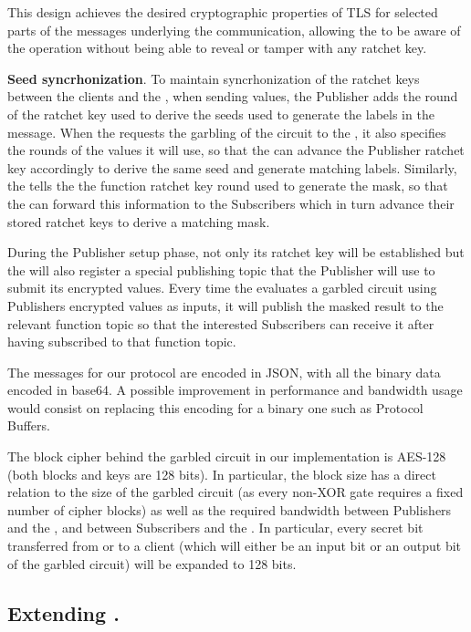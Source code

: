 This design achieves the desired cryptographic properties of TLS for selected
parts of the messages underlying the \MQTT{} communication, allowing the \broker
to be aware of the operation without being able to reveal or tamper with any
ratchet key.

\noindent\textbf{Seed syncrhonization}. To maintain syncrhonization of the
ratchet keys between the clients and the \garbler, when sending values, the
Publisher adds the round of the ratchet key used to derive the seeds used to
generate the labels in the message.  When the \broker requests the garbling of
the circuit to the \garbler, it also specifies the rounds of the values it will
use, so that the \garbler can advance the Publisher ratchet key accordingly to
derive the same seed and generate matching labels.  Similarly, the \garbler
tells the \broker the function ratchet key round used to generate the mask, so
that the \broker can forward this information to the Subscribers which in turn
advance their stored ratchet keys to derive a matching mask.

During the Publisher setup phase, not only its ratchet key will be established
but the \broker will also register a special publishing topic that the Publisher
will use to submit its encrypted values.  Every time the \broker evaluates a
garbled circuit using Publishers encrypted values as inputs, it will publish
the masked result to the relevant function topic so that the interested
Subscribers can receive it after having subscribed to that function topic.

The \MQTT{} messages for our protocol are encoded in JSON, with all the binary
data encoded in base64.  A possible improvement in performance and bandwidth
usage would consist on replacing this encoding for a binary one such as
Protocol Buffers.

The block cipher behind the garbled circuit in our implementation is AES-128
(both blocks and keys are 128 bits).  In particular, the block size has a
direct relation to the size of the garbled circuit (as every non-XOR gate
requires a fixed number of cipher blocks) as well as the required bandwidth
between Publishers and the \broker, and between Subscribers and the \broker.  In
particular, every secret bit transferred from or to a client (which will either
be an input bit or an output bit of the garbled circuit) will be expanded to
128 bits.

\vspace{-4pt}
\subsection{Extending \libgarble.}

